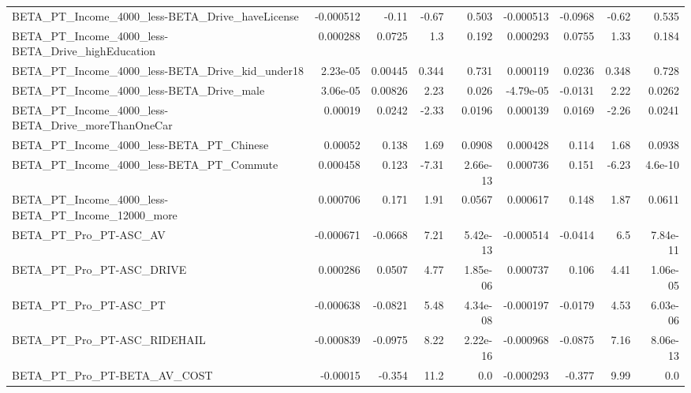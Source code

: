 \begin{tabular}{lrrrrrrrr}
BETA\_PT\_Income\_4000\_less-BETA\_Drive\_haveLicense    &   -0.000512 &        -0.11 &     -0.67 &    0.503 &  -0.000513 &     -0.0968 &        -0.62 &         0.535 \\
BETA\_PT\_Income\_4000\_less-BETA\_Drive\_highEducation  &    0.000288 &       0.0725 &       1.3 &    0.192 &   0.000293 &      0.0755 &         1.33 &         0.184 \\
BETA\_PT\_Income\_4000\_less-BETA\_Drive\_kid\_under18    &    2.23e-05 &      0.00445 &     0.344 &    0.731 &   0.000119 &      0.0236 &        0.348 &         0.728 \\
BETA\_PT\_Income\_4000\_less-BETA\_Drive\_male           &    3.06e-05 &      0.00826 &      2.23 &    0.026 &  -4.79e-05 &     -0.0131 &         2.22 &        0.0262 \\
BETA\_PT\_Income\_4000\_less-BETA\_Drive\_moreThanOneCar &     0.00019 &       0.0242 &     -2.33 &   0.0196 &   0.000139 &      0.0169 &        -2.26 &        0.0241 \\
BETA\_PT\_Income\_4000\_less-BETA\_PT\_Chinese           &     0.00052 &        0.138 &      1.69 &   0.0908 &   0.000428 &       0.114 &         1.68 &        0.0938 \\
BETA\_PT\_Income\_4000\_less-BETA\_PT\_Commute           &    0.000458 &        0.123 &     -7.31 & 2.66e-13 &   0.000736 &       0.151 &        -6.23 &       4.6e-10 \\
BETA\_PT\_Income\_4000\_less-BETA\_PT\_Income\_12000\_more &    0.000706 &        0.171 &      1.91 &   0.0567 &   0.000617 &       0.148 &         1.87 &        0.0611 \\
BETA\_PT\_Pro\_PT-ASC\_AV                              &   -0.000671 &      -0.0668 &      7.21 & 5.42e-13 &  -0.000514 &     -0.0414 &          6.5 &      7.84e-11 \\
BETA\_PT\_Pro\_PT-ASC\_DRIVE                           &    0.000286 &       0.0507 &      4.77 & 1.85e-06 &   0.000737 &       0.106 &         4.41 &      1.06e-05 \\
BETA\_PT\_Pro\_PT-ASC\_PT                              &   -0.000638 &      -0.0821 &      5.48 & 4.34e-08 &  -0.000197 &     -0.0179 &         4.53 &      6.03e-06 \\
BETA\_PT\_Pro\_PT-ASC\_RIDEHAIL                        &   -0.000839 &      -0.0975 &      8.22 & 2.22e-16 &  -0.000968 &     -0.0875 &         7.16 &      8.06e-13 \\
BETA\_PT\_Pro\_PT-BETA\_AV\_COST                        &    -0.00015 &       -0.354 &      11.2 &      0.0 &  -0.000293 &      -0.377 &         9.99 &           0.0 \\

\end{tabular}
